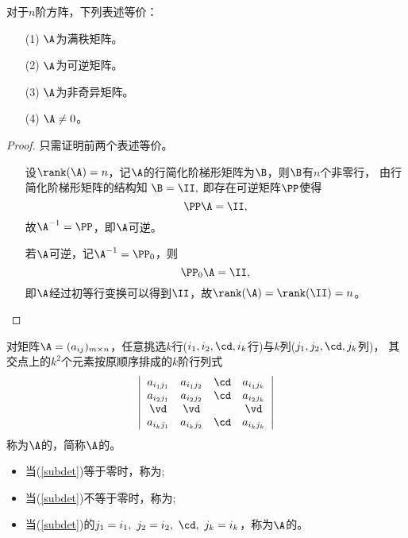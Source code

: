 \begin{dingli}
  对于$n$阶方阵，下列表述等价：
  \begin{itemize}
  \item[(1)] $\A$为满秩矩阵。
  \item[(2)] $\A$为可逆矩阵。
  \item[(3)] $\A$为非奇异矩阵。
  \item[(4)] $\A\ne 0$。
  \end{itemize}
\end{dingli}
\begin{proof}
只需证明前两个表述等价。 

\begin{itemize}
\item [\red{(1)$\Rightarrow$(2)}]    
  设$\rank(\A)=n$，记$\A$的行简化阶梯形矩阵为$\B$，则$\B$有$n$个非零行， 由行简化阶梯形矩阵的结构知
  $
  \B=\II,
  $ 
  即存在可逆矩阵$\PP$使得
  $$
  \PP\A=\II,
  $$
  故$\A^{-1}=\PP$，即$\A$可逆。
\item [\red{(2)$\Rightarrow$(1)}]   
  若$\A$可逆，记$\A^{-1}=\PP_0$，则
  $$
  \PP_0\A=\II,
  $$ 
  即$\A$经过初等行变换可以得到$\II$，故$\rank(\A)=\rank(\II)=n$。
\end{itemize}
\end{proof}





\begin{dingyi}[子式与主子式]
  对矩阵$\A=(a_{ij})_{m\times n}$，任意挑选$k$行($i_1,i_2,\cd,i_k$行)与$k$列($j_1,j_2,\cd,j_k$列)，
  其交点上的$k^2$个元素按原顺序排成的$k$阶行列式
  \begin{equation}\label{subdet}
    \left|
      \begin{array}{cccc}
        a_{i_1j_1} & a_{i_1j_2} & \cd & a_{i_1j_k}\\
        a_{i_2j_1} & a_{i_2j_2} & \cd & a_{i_2j_k}\\
        \vd & \vd && \vd\\
        a_{i_kj_1} & a_{i_kj_2} & \cd & a_{i_kj_k}\\
      \end{array}
    \right|
  \end{equation}
  称为$\A$的，简称$\A$的。 
  \begin{itemize}
  \item 当(\ref{subdet})等于零时，称为;
  \item 当(\ref{subdet})不等于零时，称为;
  \item 当(\ref{subdet})的$j_1=i_1,~j_2=i_2,~\cd,~j_k=i_k$，称为$\A$的。
  \end{itemize}
\end{dingyi}






